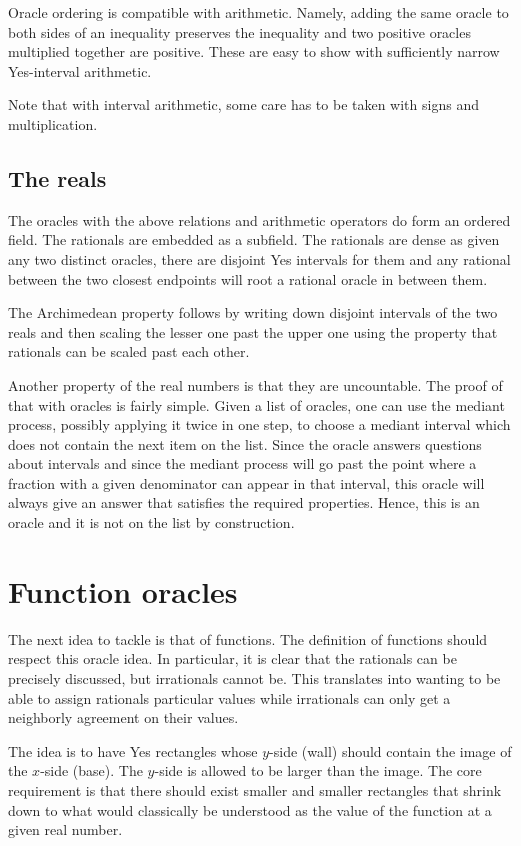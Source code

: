\documentclass[12pt]{article}
\theoremstyle{remark}
\begin{document}
Oracle ordering is compatible with arithmetic. Namely, adding the same oracle to both sides of an inequality preserves the inequality and two positive oracles multiplied together are positive. These are easy to show with sufficiently narrow Yes-interval arithmetic. 

Note that with interval arithmetic, some care has to be taken with signs and multiplication. 

\subsection{The reals}

The oracles with the above relations and arithmetic operators do form an ordered field. The rationals are embedded as a subfield. The rationals are dense as given any two distinct oracles, there are disjoint Yes intervals for them and any rational between the two closest endpoints will root a rational oracle in between them. 

The Archimedean property follows by  writing down disjoint intervals of the two reals and then scaling the lesser one past the upper one using the property that rationals can be scaled past each other. 

Another property of the real numbers is that they are uncountable. The proof of that with oracles is fairly simple. Given a list of oracles, one can use the mediant process, possibly applying it twice in one step, to choose a mediant interval which does not contain the next item on the list. Since the oracle answers questions about intervals and since the mediant process will go past the point where a fraction with a given denominator can appear in that interval, this oracle will always give an answer that satisfies the required properties.  Hence, this is an oracle and it is not on the list by construction. 

\section{Function oracles}

The next idea to tackle is that of functions. The definition of functions should respect this oracle idea.  In particular, it is clear that the rationals can be precisely discussed, but irrationals cannot be. This translates into wanting to be able to assign rationals particular values while irrationals can only get a neighborly agreement on their values. 

The idea is to have Yes rectangles whose $y$-side (wall) should contain the image of the $x$-side (base). The $y$-side is allowed to be larger than the image. The core requirement is that there should exist smaller and smaller rectangles that shrink down to what would classically be understood as the value of the function at a given real number. 
\end{document}
